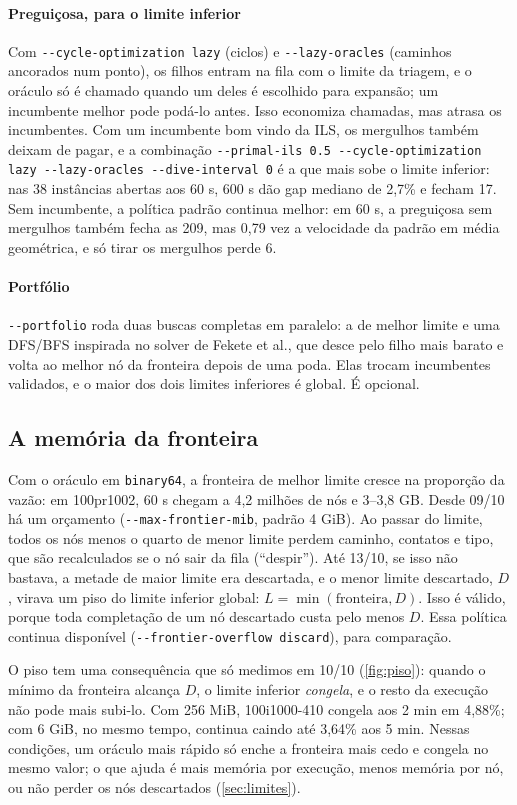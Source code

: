 \documentclass[11pt,a4paper]{article}
\theoremstyle{plain}\newtheorem{proposicao}{Proposição}
\theoremstyle{definition}\newtheorem{definicao}{Definição}
\theoremstyle{plain}\newtheorem{teorema}{Teorema}
\theoremstyle{plain}\newtheorem{lema}{Lema}
\newcommand{\code}[1]{\texttt{\small #1}}
\begin{document}
\paragraph{Preguiçosa, para o limite inferior} Com \code{-{}-cycle-optimization lazy} (ciclos) e \code{-{}-lazy-oracles} (caminhos ancorados num ponto), os filhos entram na fila com o limite da triagem, e o oráculo só é chamado quando um deles é escolhido para expansão; um incumbente melhor pode podá-lo antes. Isso economiza chamadas, mas atrasa os incumbentes. Com um incumbente bom vindo da ILS, os mergulhos também deixam de pagar, e a combinação \code{-{}-primal-ils 0.5 -{}-cycle-optimization lazy -{}-lazy-oracles -{}-dive-interval 0} é a que mais sobe o limite inferior: nas 38 instâncias abertas aos 60 s, 600 s dão gap mediano de 2,7\% e fecham 17. Sem incumbente, a política padrão continua melhor: em 60 s, a preguiçosa sem mergulhos também fecha as 209, mas 0,79 vez a velocidade da padrão em média geométrica, e só tirar os mergulhos perde 6.

\paragraph{Portfólio} \code{-{}-portfolio} roda duas buscas completas em paralelo: a de melhor limite e uma DFS/BFS inspirada no solver de Fekete et al., que desce pelo filho mais barato e volta ao melhor nó da fronteira depois de uma poda. Elas trocam incumbentes validados, e o maior dos dois limites inferiores é global. É opcional.

\subsection{A memória da fronteira}\label{sec:memoria}
Com o oráculo em \texttt{binary64}, a fronteira de melhor limite cresce na proporção da vazão: em 100pr1002, 60 s chegam a 4,2 milhões de nós e 3–3,8 GB. Desde 09/10 há um orçamento (\code{-{}-max-frontier-mib}, padrão 4 GiB). Ao passar do limite, todos os nós menos o quarto de menor limite perdem caminho, contatos e tipo, que são recalculados se o nó sair da fila (``despir''). Até 13/10, se isso não bastava, a metade de maior limite era descartada, e o menor limite descartado, \(D\), virava um piso do limite inferior global: \(L=\min(\text{fronteira},D)\). Isso é válido, porque toda completação de um nó descartado custa pelo menos \(D\). Essa política continua disponível (\code{-{}-frontier-overflow discard}), para comparação.

O piso tem uma consequência que só medimos em 10/10 (\cref{fig:piso}): quando o mínimo da fronteira alcança \(D\), o limite inferior \emph{congela}, e o resto da execução não pode mais subi-lo. Com 256 MiB, 100i1000-410 congela aos 2 min em 4,88\%; com 6 GiB, no mesmo tempo, continua caindo até 3,64\% aos 5 min. Nessas condições, um oráculo mais rápido só enche a fronteira mais cedo e congela no mesmo valor; o que ajuda é mais memória por execução, menos memória por nó, ou não perder os nós descartados (\cref{sec:limites}).
\end{document}
